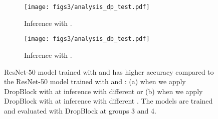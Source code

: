 \documentclass{article}
\begin{document}
\begin{figure}[h!]
  \centering
  \begin{subfigure}[b]{0.48\textwidth}
      \texttt{[image: figs3/analysis\_dp\_test.pdf]}
      \caption{Inference with .}
  \end{subfigure}
  \begin{subfigure}[b]{0.48\textwidth}
      \texttt{[image: figs3/analysis\_db\_test.pdf]}
      \caption{Inference with .}
  \end{subfigure}
\caption{ResNet-50 model trained with  and  has higher accuracy compared to the ResNet-50 model trained with  and :
    (a) when we apply DropBlock with  at inference with different  or 
    (b) when we apply DropBlock with  at inference with different .
    The models are trained and evaluated with DropBlock at groups 3 and 4.  
    }
  \label{fig:analysis}
\end{figure}
\end{document}
